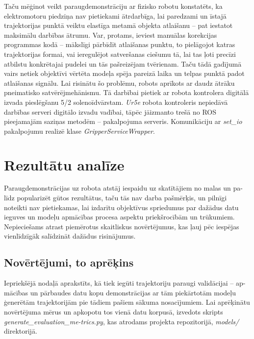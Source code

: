 \documentclass[12pt, a4paper]{article}
\numberwithin{equation}{section} %
\begin{document}
Taču mēģinot veikt paraugdemonstrāciju ar fizisko robotu konstatēts, ka elektromotoru piedziņa nav pietiekami ātrdarbīga, lai paredzami un īstajā trajektorijas punktā veiktu elastīga metamā objekta atlaišanu -- pat iestatot maksimālu darbības ātrumu. Var, protams, ieviest manuālas korekcijas programmas kodā -- mākslīgi pārbīdīt atlaišanas punktu, to pielāgojot katras trajektorijas formai, vai ieregulējot satveršanas ciešumu tā, lai tas ļoti precīzi atbilstu konkrētajai pudelei un tās pašreizējam tvērienam. Taču tādā gadījumā vairs netiek objektīvi vērtēta modeļa spēja pareizā laika un telpas punktā padot atlaišanas signālu. Lai risinātu šo problēmu, robots aprīkots ar daudz ātrāku pneimatisko satvērējmehānismu. Tā darbībai pietiek ar robota kontrolera digitālā izvada pieslēgšanu 5/2 solenoīdvārstam. \textit{Ur5e} robota kontroleris nepiedāvā darbības serveri digitālo izvadu vadībai, tāpēc jāizmanto trešā no ROS pieejamajām saziņas metodēm -- pakalpojuma serveris. Komunikāciju ar \textit{set\_io} pakalpojumu realizē klase \textit{GripperServiceWrapper}.




%
%
%
%
%
%
%
%
%
%
%
%
%
%
%
%
%
%
%

\newpage
\section{Rezultātu analīze}

Paraugdemonstrācijas uz robota atstāj iespaidu uz skatītājiem no malas un pa-līdz popularizēt gūtos rezultātus, taču tās nav darba pašmērķis, un pilnīgi noteikti nav pietiekamas, lai izdarītu objektīvus spriedumus par dažādus datu ieguves un modeļu apmācības procesa aspektu priekšrocībām un trūkumiem. Nepieciešams atrast piemērotus skaitliskus novērtējumus, kas ļauj pēc iespējas vienlīdzīgāk salīdzināt dažādus risinājumus.

\subsection{Novērtējumi, to aprēķins}

Iepriekšējā nodaļā aprakstīts, kā tiek iegūti trajektoriju paraugi validācijai -- ap-mācības un pārbaudes datu kopu demonstrācijas ar tām piekārtotām modeļu ģenerētām trajektorijām pie tādiem pašiem sākuma nosacījumiem. Lai aprēķinātu novērtējuma mērus un apkopotu tos vienā datu korpusā, izvedots skripts \textit{generate\_evaluation\_me-trics.py}, kas atrodams projekta repozitorijā, \textit{models/} direktorijā.
\end{document}
